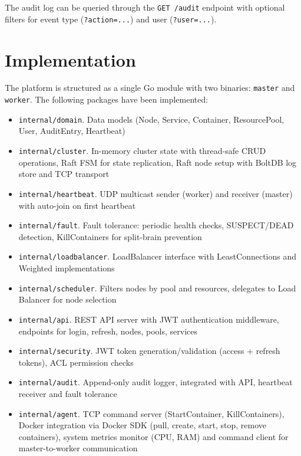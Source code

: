 The audit log can be queried through the \texttt{GET /audit} endpoint with optional filters for event type (\texttt{?action=...}) and user (\texttt{?user=...}).

\section{Implementation}

The platform is structured as a single Go module with two binaries: \texttt{master} and \texttt{worker}. The following packages have been implemented:

\begin{itemize}
    \item \texttt{internal/domain}. Data models (Node, Service, Container, ResourcePool, User, AuditEntry, Heartbeat)
    \item \texttt{internal/cluster}. In-memory cluster state with thread-safe CRUD operations, Raft FSM for state replication, Raft node setup with BoltDB log store and TCP transport
    \item \texttt{internal/heartbeat}. UDP multicast sender (worker) and receiver (master) with auto-join on first heartbeat
    \item \texttt{internal/fault}. Fault tolerance: periodic health checks, SUSPECT/DEAD detection, KillContainers for split-brain prevention
    \item \texttt{internal/loadbalancer}. LoadBalancer interface with LeastConnections and Weighted implementations
    \item \texttt{internal/scheduler}. Filters nodes by pool and resources, delegates to Load Balancer for node selection
    \item \texttt{internal/api}. REST API server with JWT authentication middleware, endpoints for login, refresh, nodes, pools, services
    \item \texttt{internal/security}. JWT token generation/validation (access + refresh tokens), ACL permission checks
    \item \texttt{internal/audit}. Append-only audit logger, integrated with API, heartbeat receiver and fault tolerance
    \item \texttt{internal/agent}. TCP command server (StartContainer, KillContainers), Docker integration via Docker SDK (pull, create, start, stop, remove containers), system metrics monitor (CPU, RAM) and command client for master-to-worker communication
\end{itemize}

